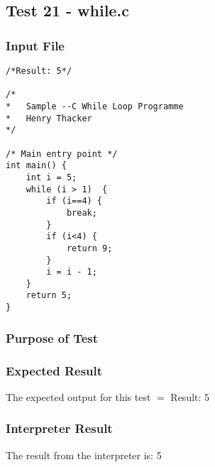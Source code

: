 \subsection{Test 21 - while.c}
\subsubsection{Input File}
\begin{lstlisting}[showstringspaces=false,breaklines=true,backgroundcolor=\color{light-gray}, captionpos=b]
/*Result: 5*/

/*
*	Sample --C While Loop Programme
*	Henry Thacker
*/

/* Main entry point */
int main() {
	int i = 5;
	while (i > 1)  {
		if (i==4) {
			break;
		}
		if (i<4) {
			return 9;
		}
		i = i - 1;
	}
	return 5;
}
\end{lstlisting}\subsubsection{Purpose of Test}

\subsubsection{Expected Result}
The expected output for this test $=$ Result: 5
\subsubsection{Interpreter Result}
The result from the interpreter is: 5
